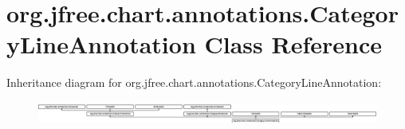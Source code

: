 \hypertarget{classorg_1_1jfree_1_1chart_1_1annotations_1_1_category_line_annotation}{}\section{org.\+jfree.\+chart.\+annotations.\+Category\+Line\+Annotation Class Reference}
\label{classorg_1_1jfree_1_1chart_1_1annotations_1_1_category_line_annotation}
Inheritance diagram for org.\+jfree.\+chart.\+annotations.\+Category\+Line\+Annotation\+:\begin{figure}[H]
\begin{center}
\leavevmode
\includegraphics[height=0.774194cm]{classorg_1_1jfree_1_1chart_1_1annotations_1_1_category_line_annotation}
\end{center}
\end{figure}
